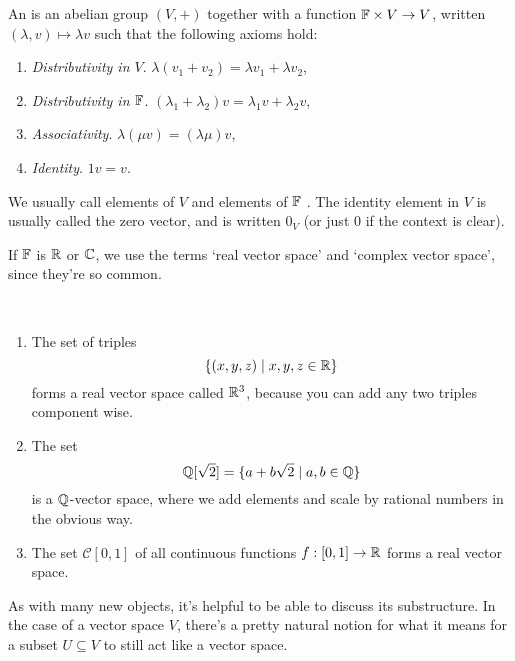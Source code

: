 \documentclass[a4paper]{scrartcl}
\begin{document}
\begin{definition}
    An  is an abelian group $(V, +)$ together with a function $\mathbb{F} \times V \rightarrow V$, written $(\lambda, v) \mapsto \lambda v$ such that the following axioms hold:
    \begin{enumerate}[label=(\roman*)]
        \item \emph{Distributivity in $V$}. $\lambda(v_1 + v_2) = \lambda v_1 + \lambda v_2$,
        \item \emph{Distributivity in $\mathbb{F}$}. $(\lambda_1 + \lambda_2)v = \lambda_1 v + \lambda_2 v$,
        \item \emph{Associativity}. $\lambda(\mu v) = (\lambda \mu) v$,
        \item \emph{Identity}. $1v = v$.
    \end{enumerate} 
\end{definition}

We usually call elements of $V$  and elements of $\mathbb{F}$ . The identity element in $V$ is usually called the zero vector, and is written $0_V$ (or just $0$ if the context is clear).

If $\mathbb{F}$ is $\mathbb{R}$ or $\mathbb{C}$, we use the terms `real vector space' and `complex vector space', since they're so common. 


\begin{example}~
    \vspace{-1.5\baselineskip}
    \begin{enumerate}[label=(\roman*)]
        
        \item The set of triples
        $$
        \{(x, y, z) \mid x, y, z \in \mathbb{R}\}
        $$ 
        forms a real vector space called $\mathbb{R}^3$, because you can add any two triples component wise. 
        \item The set
        $$
        \mathbb{Q}[\sqrt{2}] = \{a + b\sqrt{2} \mid a, b \in \mathbb{Q}\}
        $$
        is a $\mathbb{Q}$-vector space, where we add elements and scale by rational numbers in the obvious way.
        \item The set $\mathcal{C}[0, 1]$ of all continuous functions $f: [0, 1] \rightarrow \mathbb{R}$ forms a real vector space.
    \end{enumerate}
\end{example}

As with many new objects, it's helpful to be able to discuss its substructure. In the case of a vector space $V$, there's a pretty natural notion for what it means for a subset $U \subseteq V$ to still act like a vector space.
\end{document}
